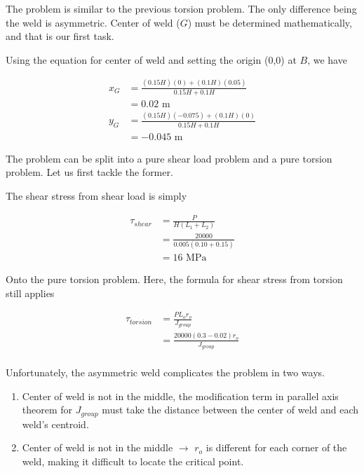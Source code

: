 \documentclass[
10pt,
a4paper,
openany,
svgnames,
]{book}
\begin{document}
\begin{solution}
  The problem is similar to the previous torsion problem. The only difference being the weld is asymmetric. Center of weld ($G$) must be determined mathematically, and that is our first task.
  
  Using the equation for center of weld and setting the origin (0,0) at $B$, we have
  
  \begin{align*}
    x_G &= \frac{(0.15H)(0) + (0.1H)(0.05)}{ 0.15H + 0.1H } \\
        &= 0.02 \text{ m} \\
    y_G &= \frac{(0.15H)(-0.075) + (0.1H)(0)}{ 0.15H + 0.1H } \\
        &= -0.045 \text{ m} 
  \end{align*}

  The problem can be split into a pure shear load problem and a pure torsion problem. Let us first tackle the former.
  
  The shear stress from shear load is simply
  
  \begin{align*}
    \tau_{shear} &= \frac{P}{H(L_1 + L_2)} \\
                 &= \frac{20000}{0.005(0.10 + 0.15)} \\
                 &= 16 \text{ MPa}
  \end{align*}

  Onto the pure torsion problem. Here, the formula for shear stress from torsion still applies

  \begin{align*}
    \tau_{torsion} &= \frac{P L_o r_o}{J_{group}} \\
                   &= \frac{20000(0.3 - 0.02)r_o}{J_{group}} \\
  \end{align*}

  Unfortunately, the asymmetric weld complicates the problem in two ways.
  \begin{enumerate}
  \item Center of weld is not in the middle, the modification term in parallel axis theorem for $J_{group}$ must take the distance between the center of weld and each weld's centroid.
  \item Center of weld is not in the middle $\rightarrow$ $r_o$ is different for each corner of the weld, making it difficult to locate the critical point.
  \end{enumerate}


\end{solution}
\end{document}
